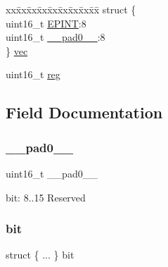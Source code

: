 \begin{DoxyCompactItemize}
\begin{tabbing}
\end{tabbing}\item 
\begin{tabbing}
xx\=xx\=xx\=xx\=xx\=xx\=xx\=xx\=xx\=\kill
struct \{\\
\>uint16\_t \mbox{\hyperlink{union_u_s_b___d_e_v_i_c_e___e_p_i_n_t_s_m_r_y___type_aafe68bdeddb72ad86b0864415e51d236}{EPINT}}:8\\
\>uint16\_t \mbox{\hyperlink{union_u_s_b___d_e_v_i_c_e___e_p_i_n_t_s_m_r_y___type_a77132c2c26a75f5b8751b235cda23828}{\_\_pad0\_\_}}:8\\
\} \mbox{\hyperlink{union_u_s_b___d_e_v_i_c_e___e_p_i_n_t_s_m_r_y___type_a9be605b3aed3d7e1cad4319e5f3409b6}{vec}}\\

\end{tabbing}\item 
uint16\+\_\+t \mbox{\hyperlink{union_u_s_b___d_e_v_i_c_e___e_p_i_n_t_s_m_r_y___type_a11760f5020019f4aa8cb02e694f7cc44}{reg}}
\end{DoxyCompactItemize}


\subsection{Field Documentation}
\mbox{\label{union_u_s_b___d_e_v_i_c_e___e_p_i_n_t_s_m_r_y___type_a77132c2c26a75f5b8751b235cda23828}} 
\subsubsection{\texorpdfstring{\_\_pad0\_\_}{\_\_pad0\_\_}}
{\footnotesize\ttfamily uint16\+\_\+t \+\_\+\+\_\+pad0\+\_\+\+\_\+}

bit\+: 8..15 Reserved \mbox{\label{union_u_s_b___d_e_v_i_c_e___e_p_i_n_t_s_m_r_y___type_ad3b99404ec2578f0e10d68e8a3eeff2f}} 
\subsubsection{\texorpdfstring{bit}{bit}}
{\footnotesize\ttfamily struct \{ ... \}   bit}

